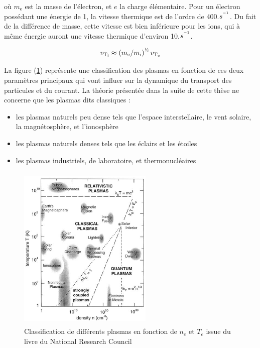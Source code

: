 où $m_\text{e}$ est la masse de l'électron, et $e$ la charge élémentaire. Pour un électron possédant
une énergie de \unit{1}{\electronvolt}, la vitesse thermique est de l'ordre de
\unit{400}{\kilo\meter}.$s^{^{-1}}$.
Du fait de la différence de masse, cette vitesse est bien inférieure pour les
ions, qui à même énergie auront une vitesse thermique d'environ \unit{10}{\kilo\meter}.$s^{^{-1}}$.

\begin{equation}
	v_{\text{T}_\text{i}}\approx\left(m_\text{e}/m_\text{i}\right)^{\text{\textonehalf}}
	v_{\text{T}_\text{e}}
\end{equation}

La figure (\ref{zoologie}) représente une classification des plasmas
en fonction de ces deux paramètres principaux qui vont influer sur la dynamique du
transport des particules et du courant.
La théorie présentée dans la suite de cette thèse ne concerne que les plasmas
dits classiques :

\begin{itemize}
  \item les plasmas naturels peu dense tels que l'espace interstellaire,
  le vent solaire, la magnétosphère, et l'ionosphère
  \item les plasmas naturels denses tels que les éclairs et les étoiles
  \item les plasmas industriels, de laboratoire, et thermonucléaires
\end{itemize}
\begin{figure}[htbp]
\centering
\includegraphics[height=80mm,width=64mm]{figures/zoologie.png}{\caption{Classification
de différents plasmas en fonction de $n_e$ et $T_e$ issue du livre du National
Research Council \citep{NRC}}\label{zoologie}}
\end{figure}

